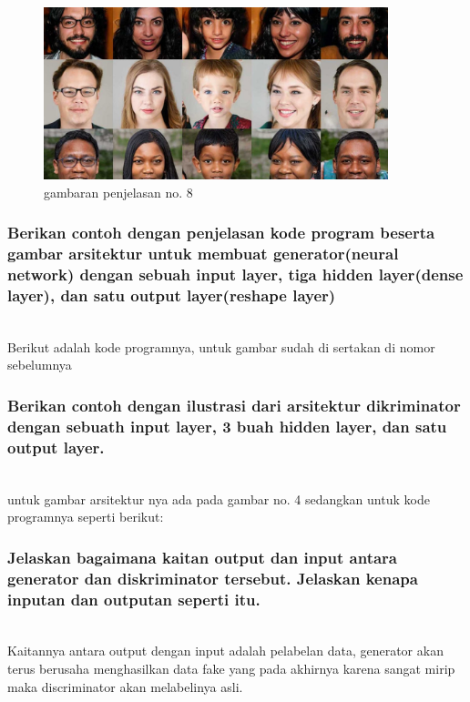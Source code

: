 \begin{figure}[H]
	\centering
	\includegraphics[width=10cm]{figures/1174079/8/implementasigan.jpg}
	\caption{gambaran penjelasan no. 8}
\end{figure}

\subsubsection{Berikan contoh dengan penjelasan kode program beserta gambar arsitektur untuk membuat generator(neural network) dengan sebuah input layer, tiga hidden layer(dense layer), dan satu output layer(reshape layer)}
\hfill\\
Berikut adalah kode programnya, untuk gambar sudah di sertakan di nomor sebelumnya


\subsubsection{Berikan contoh dengan ilustrasi dari arsitektur dikriminator dengan sebuath input layer, 3 buah hidden layer, dan satu output layer.}
\hfill\\
untuk gambar arsitektur nya ada pada gambar no. 4 sedangkan untuk kode programnya seperti berikut:



\subsubsection{Jelaskan bagaimana kaitan output dan input antara generator dan diskriminator tersebut. Jelaskan kenapa inputan dan outputan seperti itu.}
\hfill\\
Kaitannya antara output dengan input adalah pelabelan data, generator akan terus berusaha menghasilkan data fake yang pada akhirnya karena sangat mirip maka discriminator akan melabelinya asli.

